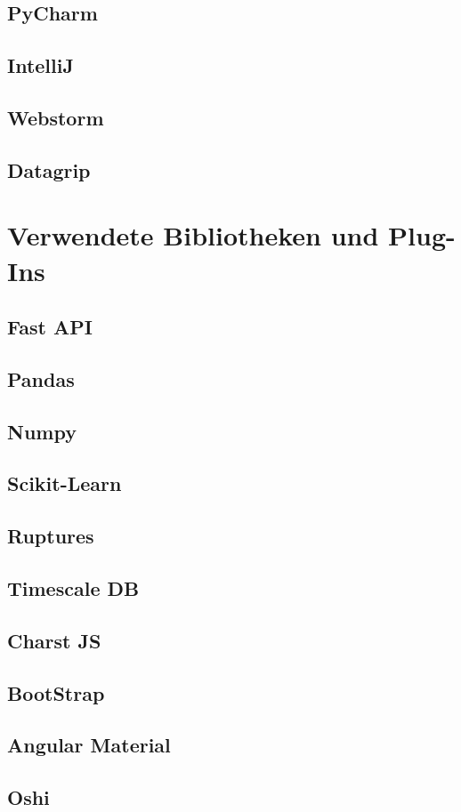 \documentclass[pdftex,11pt,a4paper]{book}
\begin{document}
\subsection{PyCharm}
\subsection{IntelliJ}
\subsection{Webstorm}
\subsection{Datagrip}
\section{Verwendete Bibliotheken und Plug-Ins}
\subsection{Fast API}
\subsection{Pandas}
\subsection{Numpy}
\subsection{Scikit-Learn}
\subsection{Ruptures}
\subsection{Timescale DB}
\subsection{Charst JS}
\subsection{BootStrap}
\subsection{Angular Material}
\subsection{Oshi}
\end{document}
